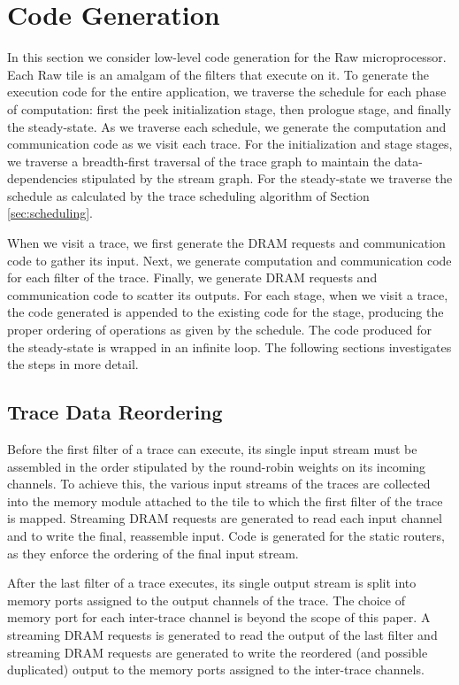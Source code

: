 \section{Code Generation}
\label{sec:codegen}
In this section we consider low-level code generation for the Raw
microprocessor. Each Raw tile is an amalgam of the filters that
execute on it. To generate the execution code for the entire
application, we traverse the schedule for each phase of computation:
first the peek initialization stage, then prologue stage, and finally
the steady-state.  As we traverse each schedule, we generate the
computation and communication code as we visit each trace.  For the
initialization and stage stages, we traverse a breadth-first traversal
of the trace graph to maintain the data-dependencies stipulated by the
stream graph. For the steady-state we traverse the schedule as
calculated by the trace scheduling algorithm of Section
\ref{sec:scheduling}.

When we visit a trace, we first generate the DRAM requests and
communication code to gather its input.  Next, we generate computation
and communication code for each filter of the trace.  Finally, we
generate DRAM requests and communication code to scatter its outputs.
For each stage, when we visit a trace, the code generated is appended
to the existing code for the stage, producing the proper ordering of
operations as given by the schedule.  The code produced for the
steady-state is wrapped in an infinite loop. The following sections
investigates the steps in more detail.

\subsection{Trace Data Reordering}
Before the first filter of a trace can execute, its single input
stream must be assembled in the order stipulated by the round-robin
weights on its incoming channels. To achieve this, the various input
streams of the traces are collected into the memory module attached to
the tile to which the first filter of the trace is mapped. Streaming
DRAM requests are generated to read each input channel and to write
the final, reassemble input.  Code is generated for the static
routers, as they enforce the ordering of the final input stream.

After the last filter of a trace executes, its single output stream is
split into memory ports assigned to the output channels of the trace.
The choice of memory port for each inter-trace channel is beyond the
scope of this paper. A streaming DRAM requests is generated to read
the output of the last filter and streaming DRAM requests are
generated to write the reordered (and possible duplicated) output to
the memory ports assigned to the inter-trace channels.


